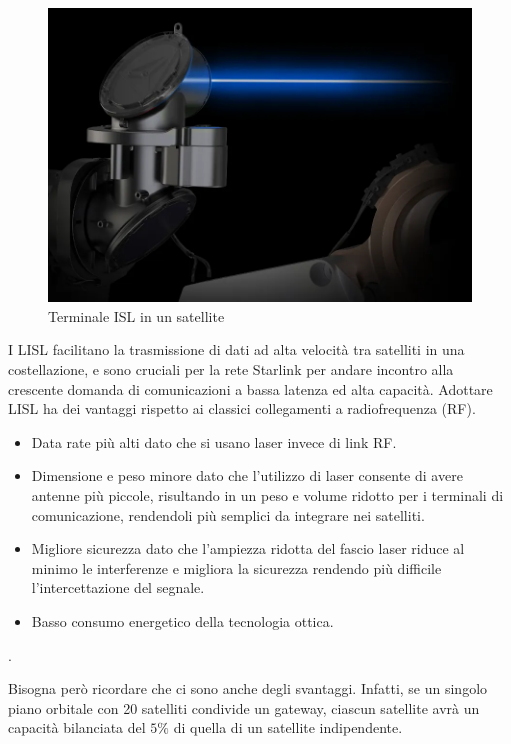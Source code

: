 \begin{figure}[htbp]
  \centering
  \includegraphics[width=0.9\linewidth]{./res/img/LISL_terminal.png}
  \caption{Terminale \ac{ISL} in un satellite \cite{mike_puchol_modeling_2022}}
  \label{fig:starlink-terminal}
\end{figure}

I \ac{LISL} facilitano la trasmissione di dati ad alta velocità tra satelliti in una costellazione, e sono cruciali per la rete Starlink per andare incontro alla crescente domanda di comunicazioni a bassa latenza ed alta capacità.
Adottare \ac{LISL} ha dei vantaggi rispetto ai classici collegamenti a radiofrequenza (\ac{RF}).
\begin{itemize}
  \item Data rate più alti dato che si usano laser invece di link \ac{RF}.
  \item Dimensione e peso minore dato che l'utilizzo di laser consente di avere antenne più piccole, risultando in un peso e volume ridotto per i terminali di comunicazione, rendendoli più semplici da integrare nei satelliti.
  \item Migliore sicurezza dato che l'ampiezza ridotta del fascio laser riduce al minimo le interferenze e migliora la sicurezza rendendo più difficile l'intercettazione del segnale.
  \item Basso consumo energetico della tecnologia ottica.
\end{itemize}
\cite{chaudhry_laser_2021}.

Bisogna però ricordare che ci sono anche degli svantaggi.
Infatti, se un singolo piano orbitale con 20 satelliti condivide un gateway, ciascun satellite avrà un capacità bilanciata del $5\%$ di quella di un satellite indipendente.


